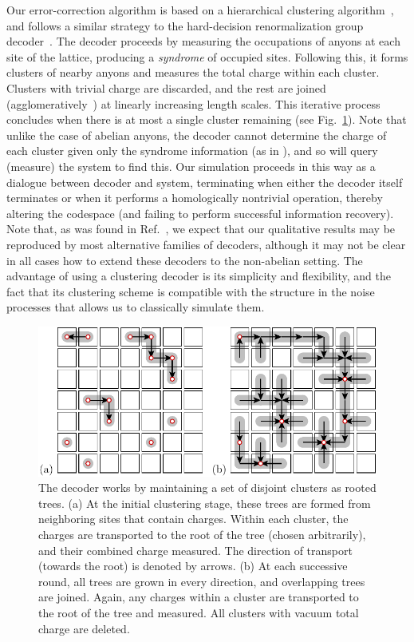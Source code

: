 \documentclass[aps, prl, letterpaper, twocolumn, superscriptaddress, notitlepage, 10pt]{revtex4-1}
\newcommand{\Fref}[1]{Fig.~\ref{#1}}
\begin{document}
Our error-correction algorithm is
based on a hierarchical clustering algorithm~\cite{Hastie2009, Wootton2015b},
and follows a similar strategy to the hard-decision renormalization group decoder~\cite{Bravyi2011}. 
The decoder proceeds by measuring the occupations of 
anyons at each site of the lattice, producing a \emph{syndrome} of occupied sites. Following this, it forms clusters of nearby anyons and 
measures the total charge within each cluster.
Clusters with trivial charge are discarded, and
the rest are joined (agglomeratively~\cite{Hastie2009})
at linearly increasing length scales. This iterative process concludes when there is at most a single cluster remaining (see \Fref{f:decode}).
Note that unlike the case of abelian anyons, the decoder
cannot determine the charge of each cluster given only the syndrome information (as in \cite{Bravyi2011}),
and so will query (measure) the system to find this.
Our simulation proceeds in this way as a dialogue between decoder
and system, terminating when either the decoder itself terminates or when it performs a homologically nontrivial operation, thereby altering the codespace (and failing to perform successful information recovery).
Note that, as was found in Ref.~\cite{Brell2013}, we expect that our qualitative results may be reproduced by most alternative families of decoders, although it may not be clear in all cases how to extend these decoders to the non-abelian setting.
The advantage of using a clustering decoder is 
its simplicity and flexibility, and the fact that its clustering scheme is compatible with the structure in the noise processes that allows us to classically simulate them.

\begin{figure}[t!]
\begin{center}
	\includegraphics[width=1.0\columnwidth]{pic-decode.pdf}
\caption{The decoder works by maintaining a set of disjoint clusters as rooted trees.
(a) At the initial clustering stage, these trees are formed 
from neighboring sites that contain charges. Within each cluster, the 
charges are transported to the root of the tree (chosen 
arbitrarily), and their combined charge measured. The direction of transport 
(towards the root) is denoted by arrows.
(b) At each successive round, all trees are grown in 
every direction, and overlapping trees are joined. Again, any charges 
within a cluster are transported to the root of the 
tree and measured. All clusters with vacuum total charge are deleted.
\label{f:decode}
}
\end{center}
\end{figure}
\end{document}
